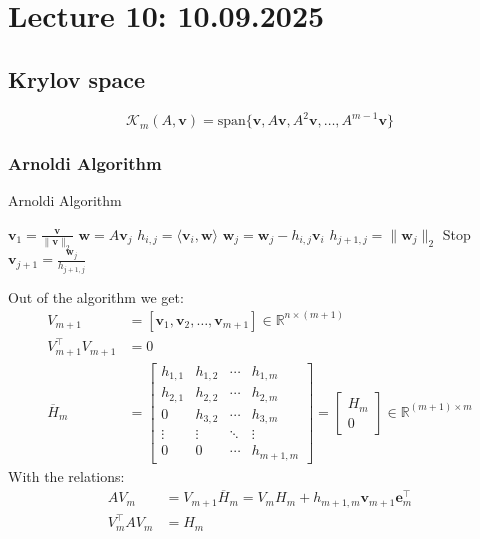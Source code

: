 \section{Lecture 10: 10.09.2025}

\subsection{Krylov space}
\[
    \mathcal{K}_m(A,\mathbf{v}) = \text{span}\{\mathbf{v}, A\mathbf{v}, A^2\mathbf{v}, \ldots, A^{m-1}\mathbf{v}\}
\]

\subsubsection{Arnoldi Algorithm}
\begin{algorithm}[H]
    \caption{Arnoldi Algorithm}
    \begin{algorithmic}[0]
        \State $\mathbf{v}_1 = \frac{\mathbf{v}}{\|\mathbf{v}\|_2}$
        \State $\mathbf{w} = A\mathbf{v}_j$
        \State $h_{i,j} = \langle \mathbf{v}_i, \mathbf{w} \rangle$
        \State $\mathbf{w}_j = \mathbf{w}_j - h_{i,j} \mathbf{v}_i$
        \EndFor
        \State $h_{j+1,j} = \|\mathbf{w}_j\|_2$
        \State Stop
        \EndIf
        \State $\mathbf{v}_{j+1} = \frac{\mathbf{w}_j}{h_{j+1,j}}$
        \EndFor
    \end{algorithmic}
\end{algorithm}

Out of the algorithm we get:
\begin{align*}
    V_{m + 1}            & = [\mathbf{v}_1, \mathbf{v}_2, \ldots, \mathbf{v}_{m+1}] \in \mathbb{R}^{n \times (m+1)} \\
    V_{m+1}^\top V_{m+1} & = 0                                                                                      \\
    \overline{H}_m       & =
    \begin{bmatrix}
        h_{1,1} & h_{1,2} & \cdots & h_{1,m}   \\
        h_{2,1} & h_{2,2} & \cdots & h_{2,m}   \\
        0       & h_{3,2} & \cdots & h_{3,m}   \\
        \vdots  & \vdots  & \ddots & \vdots    \\
        0       & 0       & \cdots & h_{m+1,m}
    \end{bmatrix}
    =
    \begin{bmatrix}
        H_m \\
        0
    \end{bmatrix}
    \in \mathbb{R}^{(m+1) \times m}
\end{align*}
With the relations:
\begin{align*}
    AV_m           & = V_{m+1} \overline{H}_m = V_m H_m + h_{m+1,m} \mathbf{v}_{m+1} \mathbf{e}_m^\top \\
    V_m^\top A V_m & = H_m
\end{align*}

